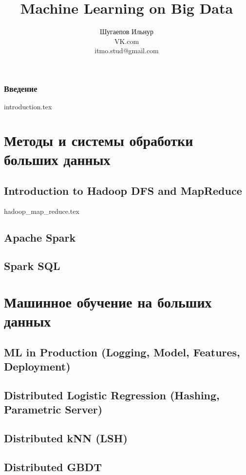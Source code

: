 \documentclass[12pt]{book}
\title{Machine Learning on Big Data}
\author{Шугаепов Ильнур 
\\
\small{VK.com} 
\\
\small{itmo.stud@gmail.com}}
\date{}
\numberwithin{equation}{section}
\begin{document}
\maketitle

\tableofcontents

\section*{Введение}
{introduction.tex}
 
\part{Методы и системы обработки больших данных}
\chapter{Introduction to Hadoop DFS and MapReduce}
{hadoop_map_reduce.tex}


\chapter{Apache Spark}

\chapter{Spark SQL}

\part{Машинное обучение на больших данных}
\chapter{ML in Production (Logging, Model, Features, Deployment)}

\chapter{Distributed Logistic Regression (Hashing, Parametric Server)}

\chapter{Distributed kNN (LSH)}

\chapter{Distributed GBDT}
\end{document}
